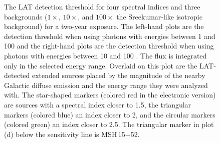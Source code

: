 \begin{figure}
    \fi
    \caption{The LAT detection threshold for four spectral indices
    and three backgrounds ($1\times$, $10\times$, and $100\times$ the
    Sreekumar-like isotropic background) for a two-year exposure. The
    left-hand plots are the detection threshold when using 
    photons with energies between
    1 \gev and 100 \gev
    and the right-hand plots are the detection threshold when using
    photons with energies between
    10 \gev and 100 \gev.  The flux is integrated only in the
    selected energy range.  Overlaid on this plot are the LAT-detected
    extended sources placed by the magnitude of the nearby Galactic
    diffuse emission and the energy range they were analyzed with.
    The star-shaped markers (colored red in the electronic version)
    are sources with a spectral index closer to 1.5, the triangular
    markers (colored blue) an index closer to 2, and the circular markers
    (colored green) an index closer to 2.5.  The triangular marker in plot
    (d) below the sensitivity line is MSH\,15$-$52.
    } 
  \end{figure}

